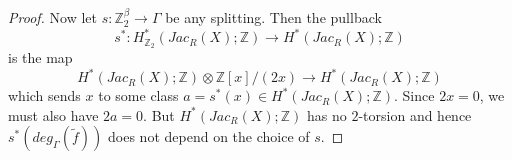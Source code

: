 \documentclass[10pt,a4paper]{amsart}
\begin{document}
\begin{proof}
Now let $s : \mathbb{Z}_2^\beta \to \Gamma$ be any splitting. Then the pullback
\[
s^* : H^*_{\mathbb{Z}_2}( Jac_R(X) ; \mathbb{Z}) \to H^*( Jac_R(X) ; \mathbb{Z})
\]
is the map
\[
H^*( Jac_R(X) ; \mathbb{Z}) \otimes \mathbb{Z}[x]/(2x) \to H^*(Jac_R(X) ; \mathbb{Z})
\]
which sends $x$ to some class $a = s^*(x) \in H^*(Jac_R(X) ; \mathbb{Z})$. Since $2x=0$, we must also have $2a=0$. But $H^*(Jac_R(X) ; \mathbb{Z})$ has no $2$-torsion and hence $s^*( deg_{\Gamma}(\widetilde{f}))$ does not depend on the choice of $s$.
\end{proof}
\end{document}
